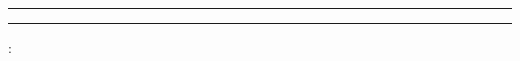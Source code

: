 
\begin{titlepage}
    \Centering
    \large \seriftext{\metaUniversity}\par\vspace{0.1cm}
    \normalsize \seriftext{\metaFaculty}\par\vspace{0.1cm}
    \ifthenelse{\equal{\metaDepartment}{}}{}{\small \seriftext{\metaDepartment}\par\vspace{0.1cm}}
    \textcolor{themecolour}{\rule{\linewidth}{0.5mm}}
    \vspace{0.2cm}
    \par{\Large \seriftext{\textbf{\metaAssignmentTitle}}}\par
    \vspace{0.2cm}
    \textcolor{themecolour}{\rule{\linewidth}{0.5mm}}\par\vspace{0.2cm}
    \small \metaCourseCode : \metaCourseName\par\vspace{0.2cm}
    \begin{minipage}[t]{0.4\textwidth}
        \begin{FlushLeft}\small
        \end{FlushLeft}
    \end{minipage}

\end{titlepage}
